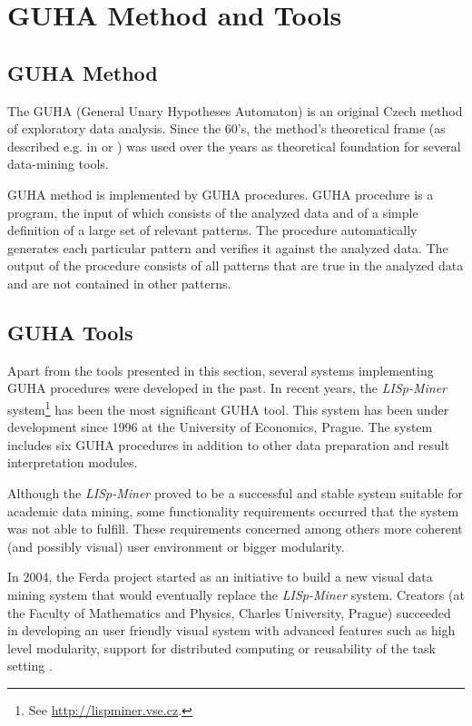 \documentclass{llncs}
\begin{document}
\section{GUHA Method and Tools}
\label{section:guha}
\subsection{GUHA Method}
The GUHA (General Unary Hypotheses Automaton) is an original Czech method
of exploratory data analysis. Since the 60's, the method's theoretical 
frame (as described e.g. in \cite{GUHA1} or \cite{GUHA2}) was used over the
years as theoretical foundation for several data-mining tools. 

GUHA method is implemented by GUHA procedures. GUHA procedure is a program,
the input of which consists of the analyzed data and of a simple
definition of a large set of relevant patterns. The procedure automatically 
generates each particular pattern and verifies it against the analyzed data.
The output of the procedure consists of all patterns that are true in the
analyzed data and are not contained in other patterns.

\subsection{GUHA Tools}
Apart from the tools presented in this section, several systems implementing
GUHA procedures were developed in the past. In recent years, the
\emph{LISp-Miner} system\footnote{See  \url{http://lispminer.vse.cz}.}
has been the most significant GUHA tool. This system
has been under development since 1996 at the University of Economics, Prague.
The system includes six GUHA procedures in addition to other data 
preparation and result interpretation modules. 

Although the \emph{LISp-Miner} proved to be a successful and stable system 
suitable for academic data mining, some functionality requirements occurred
that the system was not able to fulfill. These requirements concerned among others 
more coherent (and possibly visual) user environment or bigger modularity. 

In 2004, the Ferda project started as an initiative to build a new
visual data mining system that would eventually replace the
\emph{LISp-Miner} system. Creators (at the Faculty of Mathematics and Physics, 
Charles University, Prague) succeeded in developing an user friendly
visual system with advanced features such as high level modularity, support
for distributed computing or reusability of the task setting \cite{Ferda}.
\end{document}

